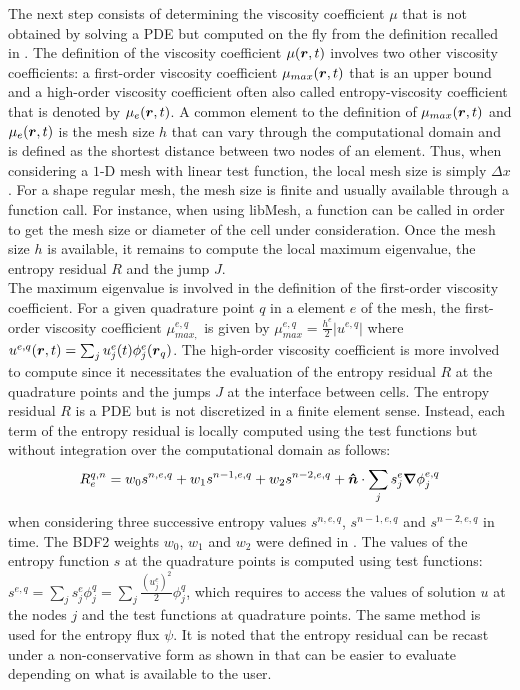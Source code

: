 The next step consists of determining the viscosity coefficient $\mu$ that is not obtained by solving a PDE but computed on the fly from the definition recalled in . The definition of the viscosity coefficient $\mu(\boldsymbol r,t)$ involves two other viscosity coefficients: a first-order viscosity coefficient $\mu_{max}(\boldsymbol r,t)$ that is an upper bound and a high-order viscosity coefficient often also called entropy-viscosity coefficient that is denoted by $\mu_e(\boldsymbol r,t)$. A common element to the definition of $\mu_{max}(\boldsymbol r,t)$ and $\mu_e(\boldsymbol r,t)$ is the mesh size $h$ that can vary through the computational domain and is defined as the shortest distance between two nodes of an element. Thus, when considering a $1$-D mesh with linear test function, the local mesh size is simply $\Delta x$. For a shape regular mesh, the mesh size is finite and usually available through a function call. For instance, when using libMesh, a function can be called in order to get the mesh size or diameter of the cell under consideration. Once the mesh size $h$ is available, it remains to compute the local maximum eigenvalue, the entropy residual $R$ and the jump $J$. \\
The maximum eigenvalue is involved in the definition of the first-order viscosity coefficient. For a given quadrature point $q$ in a element $e$ of the mesh, the first-order viscosity coefficient $\mu_{max,}^{e,q}$ is given by  $\mu_{max}^{e,q} = \frac{h^e}{2} | u^{e,q} |$ where $u^{e,q}(\boldsymbol r,t) = \sum_j u_{j}^e(t) \phi^e_j(\boldsymbol r_q)$. The high-order viscosity coefficient is more involved to compute since it necessitates the evaluation of the entropy residual $R$ at the quadrature points and the jumps $J$ at the interface between cells. The entropy residual $R$ is a PDE but is not discretized in a finite element sense. Instead, each term of the entropy residual is locally computed using the test functions but without integration over the computational domain as follows:
%
\begin{equation}\label{eq:res_disc_sct2}
R_{e}^{q,n} = w_0 s^{n,e,q} + w_1 s^{n-1,e,q} + w_2 s^{n-2,e,q} +  \boldsymbol{\hat{n}} \cdot  \sum_j s_{j}^e \boldsymbol{\nabla} \phi^{e,q}_j
\end{equation}
when considering three successive entropy values $s^{n,e,q}$, $s^{n-1,e,q}$ and $s^{n-2,e,q}$ in time. The BDF2 weights $w_0$, $w_1$ and $w_2$ were defined in . The values of the entropy function $s$ at the quadrature points is computed using test functions:    $s^{e,q} = \sum_j s^e_j \phi^q_j = \sum_j \frac{(u_j^e)^2}{2} \phi^q_j$, which requires to access the values of solution $u$ at the nodes $j$ and the test functions at quadrature points. The same method is used for the entropy flux $\psi$. It is noted that the entropy residual can be recast under a non-conservative form as shown in  that can be easier to evaluate depending on what is available to the user.
